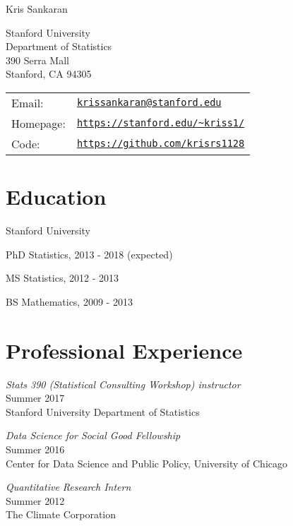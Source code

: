 \documentclass[letterpaper]{article}
\def\name{Kris Sankaran}
\renewenvironment{itemize}{
  \begin{list}{}{
    \setlength{\leftmargin}{1.5em}
  }
}{
  \end{list}
}
\begin{document}
{\huge \name}


\vspace{0.25in}

\begin{minipage}{0.45\linewidth}
  Stanford University \\
  Department of Statistics \\
  390 Serra Mall \\
  Stanford, CA 94305
\end{minipage}
\begin{minipage}{0.45\linewidth}
  \begin{tabular}{ll}
    Email: & \href{mailto:krissankaran@stanford.edu}{\tt krissankaran@stanford.edu} \\
    Homepage: & \href{http://stanford.edu/\textasciitilde kriss1}{\tt https://stanford.edu/\textasciitilde kriss1/} \\
    Code: & \href{https://github.com/krisrs1128}{\tt https://github.com/krisrs1128}
  \end{tabular}
\end{minipage}

\section*{Education}
Stanford University
\begin{itemize}
  \item PhD Statistics, 2013 - 2018 (expected)
  \item MS Statistics, 2012 - 2013
  \item BS Mathematics, 2009 - 2013
\end{itemize}

\section*{Professional Experience}
\begin{itemize}
\item \textit{Stats 390 (Statistical Consulting Workshop) instructor} \\
  Summer 2017 \\
  Stanford University Department of Statistics
\item \textit{Data Science for Social Good Fellowship} \\
  Summer 2016 \\
  Center for Data Science and Public Policy, University of Chicago
\item \textit{Quantitative Research Intern} \\
  Summer 2012 \\
  The Climate Corporation
\end{itemize}
\end{document}
